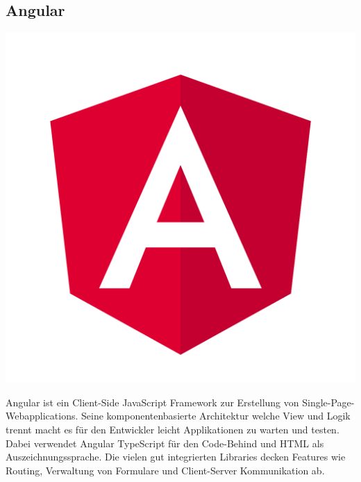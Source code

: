 \subsection{Angular}
\includegraphics[scale=0.02]{pics/angularLogo.svg.png}

Angular ist ein Client-Side JavaScript Framework zur Erstellung von Single-Page-Webapplications. 
Seine komponentenbasierte Architektur welche View und Logik trennt macht es für den Entwickler leicht 
Applikationen zu warten und testen. Dabei verwendet Angular TypeScript für den Code-Behind und HTML als Auszeichnungssprache. 
Die vielen gut integrierten Libraries decken Features wie Routing, Verwaltung von Formulare und Client-Server Kommunikation ab. 

